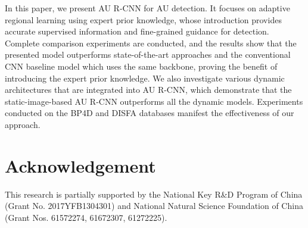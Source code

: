 \documentclass[5p,twocolumn]{elsarticle}
\begin{document}
In this paper, we present AU R-CNN for AU detection. It focuses on adaptive regional learning using expert prior knowledge, whose introduction provides accurate supervised information and fine-grained guidance for detection. Complete comparison experiments are conducted, and the results show that the presented model outperforms state-of-the-art approaches and the conventional CNN baseline model which uses the same backbone, proving the benefit of introducing the expert prior knowledge. We also investigate various dynamic architectures that are integrated into AU R-CNN, which demonstrate that the static-image-based AU R-CNN outperforms all the dynamic models. Experiments conducted on the BP4D and DISFA databases manifest the effectiveness of our approach.


\section*{Acknowledgement}
This research is partially supported by the National Key R\&D Program of China (Grant No. 2017YFB1304301) and National Natural Science Foundation of China (Grant Nos. 61572274, 61672307, 61272225).



\newpage
\end{document}
